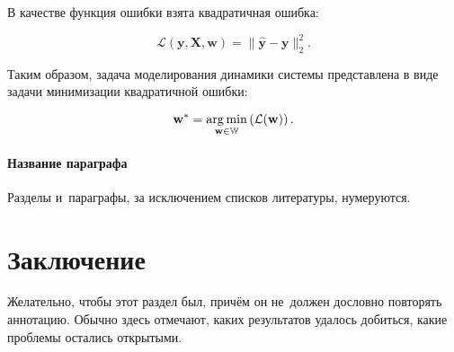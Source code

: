 \documentclass[12pt, twoside]{article}
\begin{document}
    В качестве функция ошибки взята квадратичная ошибка:

    $$\mathcal{L}(\mathbf{y}, \mathbf{X}, \mathbf{w}) = \| \hat{\mathbf{y}} - \mathbf{y} \|_2^2.$$

    Таким образом, задача моделирования динамики системы представлена в виде задачи минимизации квадратичной ошибки: 

    $$\textbf{w}^* = \argmin_{\mathbf{w}\in\mathbb{W} }\left(\mathcal{L}(\textbf{w})\right).$$

\paragraph{Название параграфа}
Разделы и~параграфы, за исключением списков литературы, нумеруются.

\section{Заключение}
Желательно, чтобы этот раздел был, причём он не~должен дословно повторять аннотацию.
Обычно здесь отмечают, каких результатов удалось добиться, какие проблемы остались открытыми.



\end{document}
